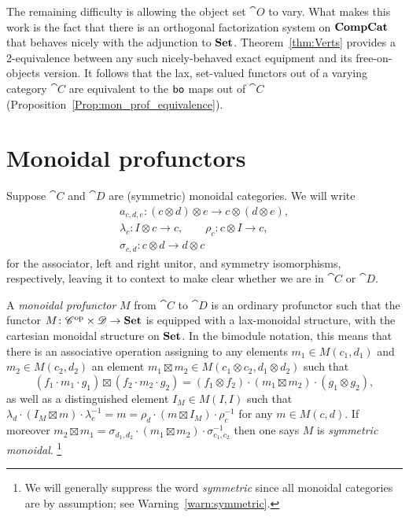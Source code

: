 \documentclass[12pt,oneside,article,draft]{memoir}
\begin{document}
The remaining difficulty is allowing the object set $\cat{O}$ to vary. What makes this work is the
fact that there is an orthogonal factorization system on $\mathbf{CompCat}$ that behaves nicely with the
adjunction to $\mathbf{Set}$. Theorem~\ref{thm:Verts} provides a 2-equivalence between any such
nicely-behaved exact equipment and its free-on-objects version. It follows that the lax, set-valued
functors out of a varying category $\cat{C}$ are equivalent to the $\mathsf{bo}$ maps out of $\cat{C}$
(Proposition~\ref{Prop:mon_prof_equivalence}). 


\section{Monoidal profunctors}\label{sec:monoidal_profunctors}

Suppose $\cat{C}$ and $\cat{D}$ are (symmetric) monoidal categories. We will write
\begin{gather*}
   a_{c,d,e}\colon (c\otimes d)\otimes e \to c\otimes(d\otimes e), \\
      \lambda_c\colon I\otimes c\to c,
      \qquad \rho_c\colon c\otimes I \to c, \\
      \sigma_{c,d}\colon c\otimes d\to d\otimes c
\end{gather*}
for the associator, left and right unitor, and symmetry isomorphisms, respectively, leaving it to
context to make clear whether we are in $\cat{C}$ or $\cat{D}$.

A \emph{monoidal profunctor} $M$ from $\cat{C}$ to $\cat{D}$ is an ordinary profunctor such that the
functor $M\colon {\mathscr{C}}^{\text{op}}\times\mathscr{D}\to\mathbf{Set}$ is equipped with a lax-monoidal structure, with
the cartesian monoidal structure on $\mathbf{Set}$. In the bimodule notation, this means that there is an
associative operation assigning to any elements $m_1\in M(c_1,d_1)$ and $m_2\in M(c_2,d_2)$ an
element $m_1\boxtimes m_2\in M(c_1\otimes c_2,d_1\otimes d_2)$ such that
\[
   (f_1\cdot m_1\cdot g_1)\boxtimes(f_2\cdot m_2\cdot g_2) = (f_1\otimes f_2)\cdot(m_1\boxtimes m_2)\cdot(g_1\otimes g_2),
\]
as well as a distinguished element $I_M\in M(I,I)$ such that $\lambda_d\cdot(I_M\boxtimes
m)\cdot\lambda^{-1}_c = m = \rho_d\cdot(m\boxtimes I_M)\cdot\rho^{-1}_c$ for any $m\in M(c,d)$. If
moreover $m_2\boxtimes m_1 = \sigma_{d_1,d_2}\cdot(m_1\boxtimes m_2)\cdot\sigma_{c_1,c_2}^{-1}$ then
one says $M$ is \emph{symmetric monoidal}.%
\footnote{We will generally suppress the word \emph{symmetric} since all monoidal categories are by assumption; see Warning~\ref{warn:symmetric}.}
\end{document}
